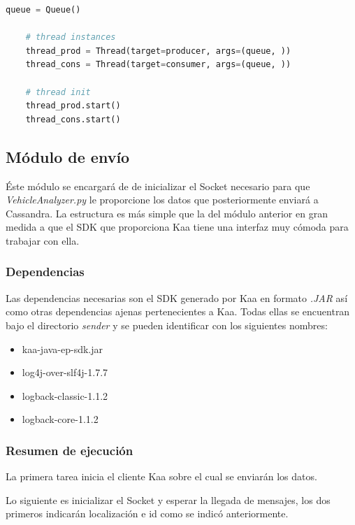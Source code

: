 \begin{lstlisting}[language=python,caption={Inicialización de las hebras},label={lst:pi1}]
	queue = Queue()

	# thread instances
	thread_prod = Thread(target=producer, args=(queue, ))
	thread_cons = Thread(target=consumer, args=(queue, ))

	# thread init
	thread_prod.start()
	thread_cons.start()

\end{lstlisting}

\newpage

\subsection{Módulo de envío}

Éste módulo se encargará de de inicializar el Socket necesario para que \textit{VehicleAnalyzer.py} le proporcione los datos que posteriormente enviará a Cassandra. La estructura es más simple que la del módulo anterior en gran medida a que el SDK que proporciona Kaa tiene una interfaz muy cómoda para trabajar con ella.

\subsubsection{Dependencias}

Las dependencias necesarias son el SDK generado por Kaa en formato \textit{.JAR} así como otras dependencias ajenas pertenecientes a Kaa. Todas ellas se encuentran bajo el directorio \textit{sender} y se pueden identificar con los siguientes nombres:

\begin{itemize}
	\item kaa-java-ep-sdk.jar
	\item log4j-over-slf4j-1.7.7
	\item logback-classic-1.1.2
	\item logback-core-1.1.2
\end{itemize}

\subsubsection{Resumen de ejecución}

La primera tarea inicia el cliente Kaa  sobre el cual se enviarán los datos.

Lo siguiente es inicializar el Socket y esperar la llegada de mensajes, los dos primeros indicarán localización e id como se indicó anteriormente.

